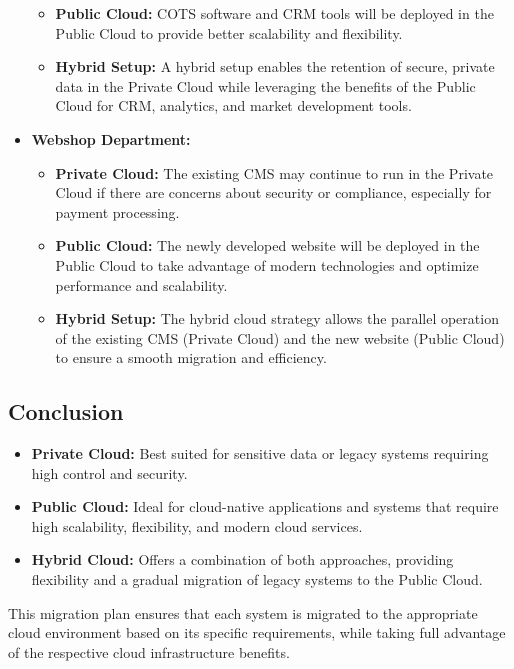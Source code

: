 \begin{itemize}
\begin{itemize}
        \item \textbf{Public Cloud:} COTS software and CRM tools will be deployed in the Public Cloud to provide better scalability and flexibility.
        \item \textbf{Hybrid Setup:} A hybrid setup enables the retention of secure, private data in the Private Cloud while leveraging the benefits of the Public Cloud for CRM, analytics, and market development tools.
    \end{itemize}
    \item \textbf{Webshop Department:}
    \begin{itemize}
        \item \textbf{Private Cloud:} The existing CMS may continue to run in the Private Cloud if there are concerns about security or compliance, especially for payment processing.
        \item \textbf{Public Cloud:} The newly developed website will be deployed in the Public Cloud to take advantage of modern technologies and optimize performance and scalability.
        \item \textbf{Hybrid Setup:} The hybrid cloud strategy allows the parallel operation of the existing CMS (Private Cloud) and the new website (Public Cloud) to ensure a smooth migration and efficiency.
    \end{itemize}
\end{itemize}

\subsection{Conclusion}

\begin{itemize}
    \item \textbf{Private Cloud:} Best suited for sensitive data or legacy systems requiring high control and security.
    \item \textbf{Public Cloud:} Ideal for cloud-native applications and systems that require high scalability, flexibility, and modern cloud services.
    \item \textbf{Hybrid Cloud:} Offers a combination of both approaches, providing flexibility and a gradual migration of legacy systems to the Public Cloud.
\end{itemize}

This migration plan ensures that each system is migrated to the appropriate cloud environment based on its specific requirements, while taking full advantage of the respective cloud infrastructure benefits.
